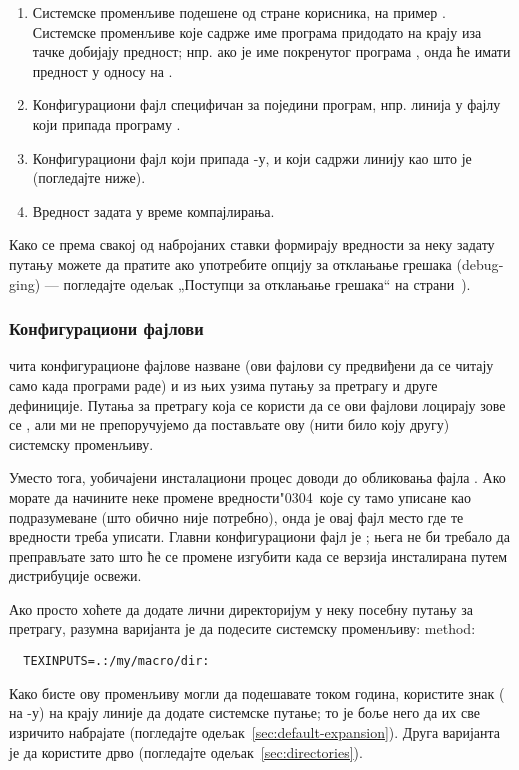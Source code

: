 \documentclass{article}
\begin{document}
\begin{enumerate}
\item Системске променљиве подешене од стране корисника, на пример
\@. Системске променљиве које садрже име програма
  придодато на крају иза тачке добијају предност; нпр. ако је име
  покренутог програма , онда ће 
  имати предност у односу на .
\item Конфигурациони фајл специфичан за поједини програм, нпр. линија
   у фајлу  који припада програму
  .
\item Конфигурациони фајл  који припада \KPS{}-у, и
  који садржи линију као што је  (погледајте
  ниже).
\item Вредност задата у време компајлирања.
\end{enumerate}
\noindent Како се према свакој од набројаних ставки формирају
вредности за неку задату путању можете да пратите ако употребите
опцију за отклањање грешака (\textenglish{debugging}) --- погледајте
одељак „Поступци за отклањање грешака“ на
страни~\pageref{sec:debugging}).

\subsubsection{Конфигурациони фајлови}

\KPS{} чита конфигурационе фајлове назване  (ови
фајлови су предвиђени да се читају само када програми раде) и из њих
узима путању за претрагу и друге дефиниције. Путања за претрагу која
се користи да се  ови фајлови лоцирају зове се
, али ми не препоручујемо да постављате ову (нити
било коју другу) системску променљиву.

Уместо тога, уобичајени инсталациони процес доводи до обликовања
фајла . Ако морате да начините неке промене
вредности\char"0304\ које су тамо уписане као подразумеване (што
обично није потребно), онда је овај фајл место где те вредности треба
уписати. Главни конфигурациони фајл је
; њега не би требало да
преправљате зато што ће се промене изгубити када се верзија
инсталирана путем дистрибуције освежи.

Ако просто хоћете да додате лични директоријум у неку посебну путању
за претрагу, разумна варијанта је да подесите системску променљиву:
method:
\begin{verbatim}
  TEXINPUTS=.:/my/macro/dir:
\end{verbatim}
Како бисте ову променљиву могли да подешавате током година, користите
знак \samp{:} (\samp{;} на \Windows{}-у) на крају линије да
додате системске путање; то је боље него да их све изричито набрајате
(погледајте одељак~\ref{sec:default-expansion}). Друга варијанта је
да користите дрво  (погледајте 
одељак~\ref{sec:directories}).
\end{document}
